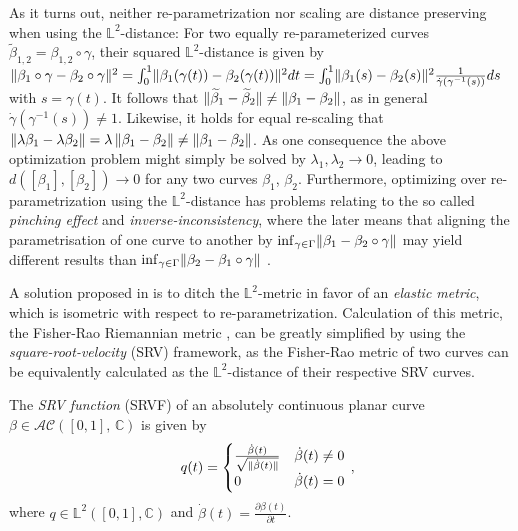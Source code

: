 As it turns out, neither re-parametrization nor scaling are distance preserving when using the $\mathbb{L}^2$-distance:
For two equally re-parameterized curves $\widetilde\beta_{1,2} = \beta_{1,2} \circ \gamma$, their squared $\mathbb{L}^2$-distance is given by $\lVert\beta_1 \circ \gamma - \beta_2 \circ \gamma\rVert^2 = \int_0^1 \lVert\beta_1(\gamma(t)) - \beta_2(\gamma(t))\rVert^2 dt = \int_0^1 \lVert\beta_1(s) - \beta_2(s)\rVert^2 \frac{1}{\dot\gamma(\gamma^{-1}(s))} ds$ with $s = \gamma(t)$.
It follows that $\lVert\widetilde\beta_1 - \widetilde\beta_2\rVert \neq \lVert\beta_1 - \beta_2\rVert$, as in general $\dot\gamma(\gamma^{-1}(s)) \neq 1$.
Likewise, it holds for equal re-scaling that $\lVert\lambda \beta_1 - \lambda \beta_2\rVert = \lambda\, \lVert\beta_1 - \beta_2\rVert \neq \lVert\beta_1 - \beta_2\rVert$.
As one consequence the above optimization problem might simply be solved by $\lambda_1, \lambda_2 \rightarrow 0$, leading to $d([\beta_1], [\beta_2]) \rightarrow 0$ for any two curves $\beta_1$, $\beta_2$.
Furthermore, optimizing over re-parametrization using the $\mathbb{L}^2$-distance has problems relating to the so called \textit{pinching effect} and \textit{inverse-inconsistency}, where the later means that aligning the parametrisation of one curve to another by $\inf_{\gamma \in \Gamma} \lVert\beta_1 - \beta_2 \circ \gamma\rVert$ may yield different results than $\inf_{\gamma \in \Gamma} \lVert\beta_2 - \beta_1 \circ \gamma\rVert$  \parencite[see][88]{SrivastavaKlassen2016}.

A solution proposed in \cite{SrivastavaEtAl2011} is to ditch the $\mathbb{L}^2$-metric in favor of an \textit{elastic metric}, which is isometric with respect to re-parametrization.
Calculation of this metric, the Fisher-Rao Riemannian metric \parencite{Rao1945}, can be greatly simplified by using the \textit{square-root-velocity} (SRV) framework, as the Fisher-Rao metric of two curves can be equivalently calculated as the $\mathbb{L}^2$-distance of their respective SRV curves.

\begin{definition}
  The \emph{SRV function} (SRVF) of an absolutely continuous planar curve $\beta \in \mathcal{AC}([0,1],\,\mathbb{C})$ is given by 
  $$ \quad q(t) = 
    \begin{cases}
      \frac{\dot{\beta}(t)}{\sqrt{\lVert\dot{\beta}(t)\rVert}} & \dot{\beta}(t) \neq 0 \\
      0 & \dot{\beta}(t) = 0
    \end{cases}\,, $$
  where $q \in \mathbb{L}^2([0,1], \mathbb{C})$ and $\dot\beta(t) = \frac{\partial\beta(t)}{\partial t}$.
\end{definition}

